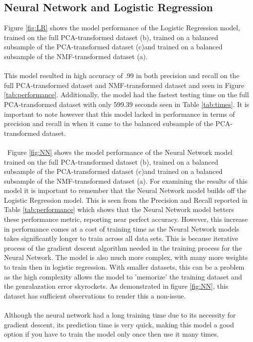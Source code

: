 \documentclass{article}
\newcommand{\PCAF}{(b)}
\newcommand{\PCAB}{(c)}
\newcommand{\NMFB}{(a)}
\begin{document}
\begin{multicols}{2}
\subsection{Neural Network and Logistic Regression}
Figure \ref{fig:LR} shows the model performance of the Logistic Regression model, trained on the full PCA-transformed dataset \PCAF, trained on a balanced subsample of the PCA-transformed dataset \PCAB and trained on a balanced subsample of the NMF-transformed dataset \NMFB. 
\\\\
This model resulted in high accuracy of .99 in both precision and recall on the full PCA-transformed dataset and NMF-transformed dataset and seen in Figure \ref{tab:performance}.
Additionally, the model had the fastest testing time on the full PCA-transformed dataset with only 599.39 seconds seen in Table \ref{tab:times}. It is important to note however that this model lacked in performance in terms of precision and recall in when it came to the balanced subsample of the PCA-transformed dataset. 
\\\\\
Figure \ref{fig:NN} shows the model performance of the Neural Network model trained on the full PCA-transformed dataset \PCAF, trained on a balanced subsample of the PCA-transformed dataset \PCAB and trained on a balanced subsample of the NMF-transformed dataset \NMFB. 
For examining the results of this model it is important to remember that the Neural Network model builds off the Logistic Regression model. This is seen from the Precision and Recall reported in Table \ref{tab:performance} which shows that the Neural Network model betters these performance metric, reporting near perfect accuracy. However, this increase in performance comes at a cost of training time as the Neural Network models takes significantly longer to train across all data sets. This is because iterative process of the gradient descent algorithm needed in the training process for the Neural Network. The model is also much more complex, with many more weights to train then in logistic regression. With smaller datasets, this can be a problem as the high complexity allows the model to 'memorize' the training dataset and the genralazation error skyrockets. As demonstrated in figure \ref{fig:NN}, this dataset has sufficient observations to render this a non-issue.
\\\\
Although the neural network had a long training time due to its necessity for gradient descent, its prediction time is very quick, making this model a good option if you have to train the model only once then use it many times.

\end{multicols}
\end{document}
